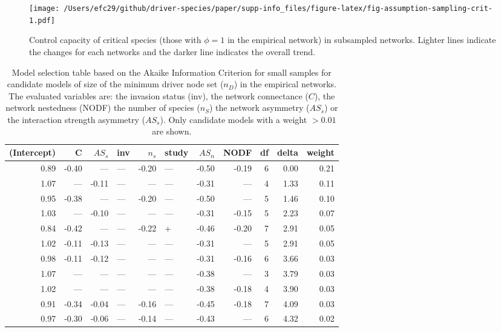 \documentclass[a4paper]{artikel1}
\theoremstyle{definition}
\theoremstyle{definition}
\theoremstyle{definition}
\theoremstyle{remark}
\begin{document}
\begin{figure}
\centering
\texttt{[image: /Users/efc29/github/driver-species/paper/supp-info\_files/figure-latex/fig-assumption-sampling-crit-1.pdf]}
\caption{\label{fig:fig-assumption-sampling-crit}Control capacity of
critical species (those with \(\phi = 1\) in the empirical network) in
subsampled networks. Lighter lines indicate the changes for each
networks and the darker line indicates the overall trend.}
\end{figure}

\clearpage

\begin{table}

\caption{\label{tab:tab-controllability-model-results}Model selection table based on the Akaike Information Criterion for small samples for candidate models of size of the minimum driver node set ($n_D$) in the empirical networks. The evaluated variables are: the invasion status (inv), the network connectance ($C$), the network nestedness (NODF) the number of species ($n_S$) the network asymmetry ($AS_s$) or the interaction strength asymmetry ($AS_s$). Only candidate models with a weight $>0.01$ are shown.}
\centering
\fontsize{8}{10}\selectfont
\begin{tabular}[t]{rrrlrlrrrrr}
\toprule
(Intercept) & C & $AS_s$ & inv & $n_s$ & study & $AS_n$ & NODF & df & delta & weight\\
\midrule
0.89 & -0.40 & --- & --- & -0.20 & --- & -0.50 & -0.19 & 6 & 0.00 & 0.21\\
1.07 & --- & -0.11 & --- & --- & --- & -0.31 & --- & 4 & 1.33 & 0.11\\
0.95 & -0.38 & --- & --- & -0.20 & --- & -0.50 & --- & 5 & 1.46 & 0.10\\
1.03 & --- & -0.10 & --- & --- & --- & -0.31 & -0.15 & 5 & 2.23 & 0.07\\
0.84 & -0.42 & --- & --- & -0.22 & + & -0.46 & -0.20 & 7 & 2.91 & 0.05\\
1.02 & -0.11 & -0.13 & --- & --- & --- & -0.31 & --- & 5 & 2.91 & 0.05\\
0.98 & -0.11 & -0.12 & --- & --- & --- & -0.31 & -0.16 & 6 & 3.66 & 0.03\\
1.07 & --- & --- & --- & --- & --- & -0.38 & --- & 3 & 3.79 & 0.03\\
1.02 & --- & --- & --- & --- & --- & -0.38 & -0.18 & 4 & 3.90 & 0.03\\
0.91 & -0.34 & -0.04 & --- & -0.16 & --- & -0.45 & -0.18 & 7 & 4.09 & 0.03\\
0.97 & -0.30 & -0.06 & --- & -0.14 & --- & -0.43 & --- & 6 & 4.32 & 0.02\\

\end{tabular}
\end{table}
\end{document}
